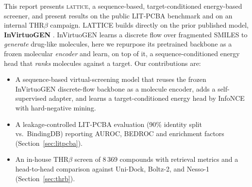 \documentclass[10pt]{article}
\newcommand{\thrbTotal}{8\,369}\newcommand{\thrbBinders}{357}
\begin{document}
This report presents \textsc{lattice}, a sequence-based, target-conditioned
energy-based screener, and present results on the public
LIT-PCBA benchmark \citep{tran2020litpcba} and on an internal THR$\beta$ campaign.
LATTICE builds directly on the prior published model,
\textbf{InVirtuoGEN} \citep{kaech2025invirtuogen}. InVirtuoGEN learns a
discrete flow over fragmented SMILES to \emph{generate} drug-like molecules, here
we repurpose its pretrained backbone as a frozen molecular \emph{encoder} and
learn, on top of it, a sequence-conditioned energy head that \emph{ranks} molecules
against a target. Our contributions are:
\begin{itemize}
  \item A sequence-based virtual-screening model that reuses the frozen
        InVirtuoGEN discrete-flow backbone as a molecule encoder, adds a
        self-supervised adapter, and learns a target-conditioned energy head
        by InfoNCE with hard-negative mining.
  \item A leakage-controlled LIT-PCBA evaluation (90\% identity split vs.\
        BindingDB) reporting AUROC, BEDROC and enrichment factors
        (Section~\ref{sec:litpcba}).
  \item An in-house THR$\beta$ screen of \thrbTotal{} compounds with retrieval
        metrics and a head-to-head comparison against Uni-Dock, Boltz-2, and
        Nesso-1 (Section~\ref{sec:thrb}).
\end{itemize}
\end{document}
